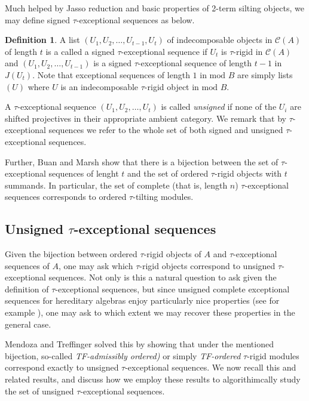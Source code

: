\documentclass[]{article}
\theoremstyle{definition}
\newtheorem{definition}{Definition}[section]
\newcommand{\tu}{\ensuremath{\tau}}
\begin{document}
Much helped by Jasso reduction and basic properties of 2-term silting objects, we may define signed \tu-exceptional sequences as below.

\begin{definition}
A list $(U_1,U_2,\dots,U_{t-1},U_t)$ of indecomposable objects in $\mathcal{C}(A)$ of length $t$ is a called a signed \tu-exceptional sequence if $U_t$ is $\tu$-rigid in $\mathcal{C}(A)$ and $(U_1,U_2,\dots,U_{t-1})$ is a signed \tu-exceptional sequence of length $t-1$ in $J(U_t)$. Note that exceptional sequences of length $1$ in $\text{mod } B$ are simply lists $(U)$ where $U$ is an indecomposable \tu-rigid object in $\text{mod } B$.
\end{definition} 

A \tu-exceptional sequence $(U_1,U_2,\dots,U_t)$ is called \textit{unsigned} if none of the $U_i$ are shifted projectives in their appropriate ambient category. We remark that by \tu-exceptional sequences we refer to the whole set of both signed and unsigned \tu-exceptional sequences.

Further, Buan and Marsh show that there is a bijection between the set of \tu-exceptional sequences of lenght $t$ and the set of ordered \tu-rigid objects with $t$ summands. In particular, the set of complete (that is, length $n$) \tu-exceptional sequences corresponds to ordered \tu-tilting modules.


\subsection{Unsigned \tu-exceptional sequences}
Given the bijection between ordered \tu-rigid objects of $A$ and \tu-exceptional sequences of $A$, one may ask which \tu-rigid objects correspond to unsigned \tu-exceptional sequences. Not only is this a natural question to ask given the definition of \tu-exceptional sequences, but since unsigned complete exceptional sequences for hereditary algebras enjoy particularly nice properties (see for example \cite{ringel_exceptional}), one may ask to which extent we may recover these properties in the general case.

Mendoza and Treffinger\cite{mendoza2020stratifying} solved this by showing that under the mentioned bijection, so-called \textit{TF-admissibly ordered)} or simply \textit{TF-ordered} \tu-rigid modules correspond exactly to unsigned \tu-exceptional sequences. We now recall this and related results, and discuss how we employ these results to algorithimcally study the set of unsigned \tu-exceptional sequences.
\end{document}
